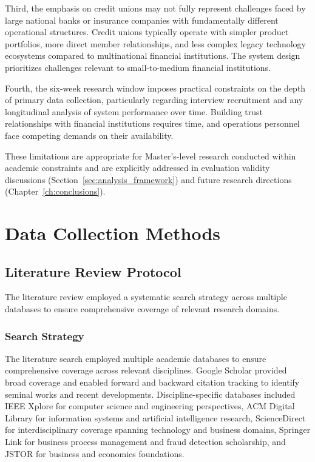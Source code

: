 Third, the emphasis on credit unions may not fully represent challenges faced by large national banks or insurance companies with fundamentally different operational structures. Credit unions typically operate with simpler product portfolios, more direct member relationships, and less complex legacy technology ecosystems compared to multinational financial institutions. The system design prioritizes challenges relevant to small-to-medium financial institutions.

Fourth, the six-week research window imposes practical constraints on the depth of primary data collection, particularly regarding interview recruitment and any longitudinal analysis of system performance over time. Building trust relationships with financial institutions requires time, and operations personnel face competing demands on their availability.

These limitations are appropriate for Master's-level research conducted within academic constraints and are explicitly addressed in evaluation validity discussions (Section~\ref{sec:analysis_framework}) and future research directions (Chapter~\ref{ch:conclusions}).

\section{Data Collection Methods}\label{sec:data_collection}

\subsection{Literature Review Protocol}

The literature review employed a systematic search strategy across multiple databases to ensure comprehensive coverage of relevant research domains.

\subsubsection{Search Strategy}

The literature search employed multiple academic databases to ensure comprehensive coverage across relevant disciplines. Google Scholar provided broad coverage and enabled forward and backward citation tracking to identify seminal works and recent developments. Discipline-specific databases included IEEE Xplore for computer science and engineering perspectives, ACM Digital Library for information systems and artificial intelligence research, ScienceDirect for interdisciplinary coverage spanning technology and business domains, Springer Link for business process management and fraud detection scholarship, and JSTOR for business and economics foundations.


